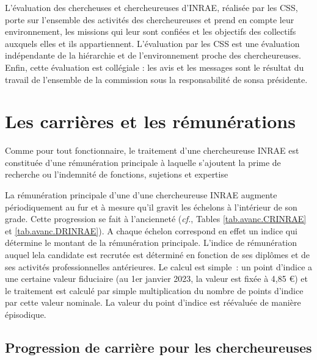 L'\'evaluation des chercheuses et chercheur\mp euse\mp s d'INRAE, r\'ealis\'ee par les CSS, porte sur l'ensemble des activit\'es des chercheur\mp euse\mp s et prend en compte leur environnement, les missions qui leur sont confi\'ees et les objectifs des collectifs auxquels elles et ils appartiennent. L'\'evaluation par les CSS est une \'evaluation ind\'ependante de la hi\'erarchie et de l'environnement proche des chercheur\mp euse\mp s. Enfin, cette \'evaluation est coll\'egiale : les avis et les messages sont le r\'esultat du travail de l'ensemble de la commission sous la responsabilit\'e de son\mp sa pr\'esident\mp e.

\section{ Les carri\`eres et les r\'emun\'erations}

Comme pour tout fonctionnaire, le traitement d'un\mp e chercheur\mp euse INRAE est constitu\'ee
d'une r\'emun\'eration principale \`a laquelle s'ajoutent la prime de recherche ou l'indemnit\'e de fonctions, sujetions et expertise

La r\'emun\'eration principale d'un\mp e d'un\mp e chercheur\mp euse INRAE augmente
p\'e\-rio\-di\-quement au fur et \`a mesure qu'il gravit les
\'echelons \`a l'int\'erieur de son grade. Cette progression se fait \`a l'anciennet\'e ({\em cf.}, Tables \ref{tab.avanc.CRINRAE} et \ref{tab.avanc.DRINRAE}).
A chaque \'echelon correspond en effet un indice qui d\'etermine le montant de la
r\'emun\'eration principale. L'indice de r\'emun\'eration auquel le\mp la candidat\mp e est recrut\'e\mp e est d\'etermin\'e en fonction de ses dipl\^omes et de ses activit\'es professionnelles ant\'erieures. Le calcul est simple~: un point
d'indice a une certaine valeur fiduciaire (au 1er janvier 2023, la valeur est fix\'ee \`a 4,85 \euro) et le traitement est
calcul\'e par simple multiplication du nombre de points d'indice par
cette valeur nominale. La valeur du point d'indice est
r\'e\'evalu\'ee de mani\`ere \'episodique.


\subsection{ Progression de carri\`ere pour les chercheur\mp euse\mp s}

